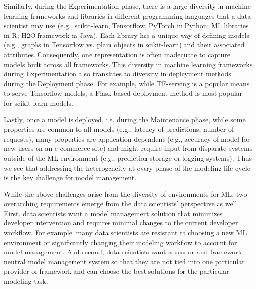 \documentclass[11pt]{article}
\newcommand{\dss}{data scientists\xspace}
\newcommand{\ds}{data scientist\xspace}
\begin{document}
Similarly, during the Experimentation phase, there is a large diversity in machine learning frameworks and libraries in different programming languages that a \ds may use (e.g., scikit-learn, Tensorflow, PyTorch in Python; ML libraries in R; H2O framework in Java).
Each library has a unique way of defining models (e.g., graphs in Tensorflow vs. plain objects in scikit-learn) and their associated attributes.
Consequently, one representation is often inadequate to capture models built across all frameworks.
This diversity in machine learning frameworks during Experimentation also translates to diversity in deployment methods during the Deployment phase.
For example, while TF-serving is a popular means to serve Tensorflow models, a Flask-based deployment method is most popular for scikit-learn models.

Lastly, once a model is deployed, i.e. during the Maintenance phase, while some properties are common to all models (e.g., latency of predictions, number of requests), many properties are application dependent (e.g., accuracy of model for new users on an e-commerce site) and might require input from disparate systems outside of the ML environment (e.g., prediction storage or logging systems).
Thus we see that addressing the heterogeneity at every phase of the modeling life-cycle is the key challenge for model management.


While the above challenges arise from the diversity of environments for ML, two overarching requirements emerge from the data scientists' perspective as well.
First, \dss want a model management solution that minimizes developer intervention and requires minimal changes to the current developer workflow.
For example, many \dss are resistant to choosing a new ML environment or significantly changing their modeling workflow to account for model management.
And second, \dss want a vendor and framework-neutral model management system so that they are not tied into one particular provider or framework and can choose the best solutions for the particular modeling task.
\end{document}
